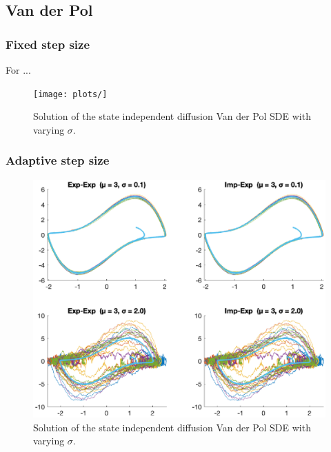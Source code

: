 \subsection{Van der Pol}

\subsubsection*{Fixed step size}
For ...

\begin{figure}[H]
    \centering
    \texttt{[image: plots/]}
    \caption{Solution of the state independent diffusion Van der Pol SDE with varying $\sigma$.}
    \label{fig:4b}
\end{figure}

\subsubsection*{Adaptive step size}

\begin{figure}[H]
    \centering
    \includegraphics[width=\textwidth]{plots/4b.eps}
    \caption{Solution of the state independent diffusion Van der Pol SDE with varying $\sigma$.}
    \label{fig:4b}
\end{figure}

